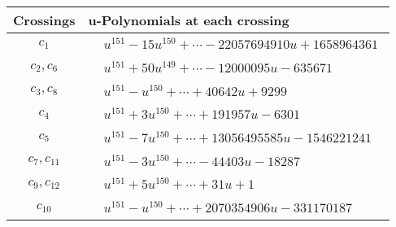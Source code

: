 \documentclass[1p]{elsarticle_modified}
\theoremstyle{definition}
\begin{document}
\begin{tabular}{m{50pt}|m{274pt}}
Crossings & \hspace{64pt}u-Polynomials at each crossing \\
\hline $$\begin{aligned}c_{1}\end{aligned}$$&$\begin{aligned}
&u^{151}-15 u^{150}+\cdots-22057694910 u+1658964361
\end{aligned}$\\
\hline $$\begin{aligned}c_{2},c_{6}\end{aligned}$$&$\begin{aligned}
&u^{151}+50 u^{149}+\cdots-12000095 u-635671
\end{aligned}$\\
\hline $$\begin{aligned}c_{3},c_{8}\end{aligned}$$&$\begin{aligned}
&u^{151}- u^{150}+\cdots+40642 u+9299
\end{aligned}$\\
\hline $$\begin{aligned}c_{4}\end{aligned}$$&$\begin{aligned}
&u^{151}+3 u^{150}+\cdots+191957 u-6301
\end{aligned}$\\
\hline $$\begin{aligned}c_{5}\end{aligned}$$&$\begin{aligned}
&u^{151}-7 u^{150}+\cdots+13056495585 u-1546221241
\end{aligned}$\\
\hline $$\begin{aligned}c_{7},c_{11}\end{aligned}$$&$\begin{aligned}
&u^{151}-3 u^{150}+\cdots-44403 u-18287
\end{aligned}$\\
\hline $$\begin{aligned}c_{9},c_{12}\end{aligned}$$&$\begin{aligned}
&u^{151}+5 u^{150}+\cdots+31 u+1
\end{aligned}$\\
\hline $$\begin{aligned}c_{10}\end{aligned}$$&$\begin{aligned}
&u^{151}- u^{150}+\cdots+2070354906 u-331170187
\end{aligned}$\\
\hline
\end{tabular}\\~\\
\end{document}
